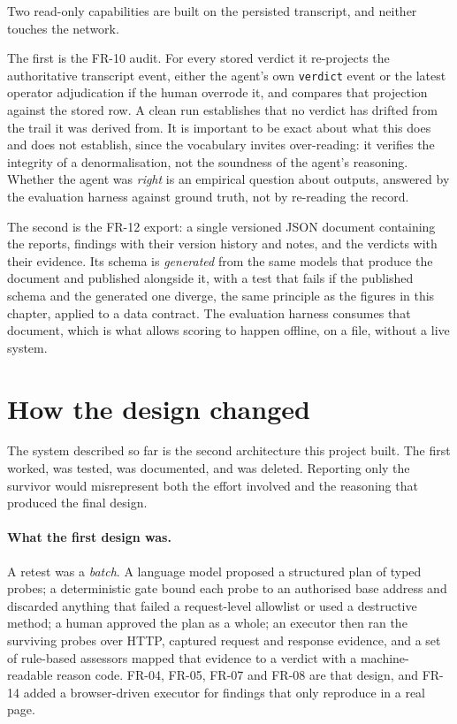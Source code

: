 Two read-only capabilities are built on the persisted transcript, and neither
touches the network.

The first is the FR-10 audit. For every stored verdict it re-projects the
authoritative transcript event, either the agent's own \texttt{verdict} event or the
latest operator adjudication if the human overrode it, and compares that
projection against the stored row. A clean run establishes that no verdict has
drifted from the trail it was derived from. It is important to be exact about
what this does and does not establish, since the vocabulary invites
over-reading: it verifies the integrity of a denormalisation, not the soundness
of the agent's reasoning. Whether the agent was \emph{right} is an empirical
question about outputs, answered by the evaluation harness against ground truth,
not by re-reading the record.

The second is the FR-12 export: a single versioned JSON document containing the
reports, findings with their version history and notes, and the verdicts with
their evidence. Its schema is \emph{generated} from the same models that produce
the document and published alongside it, with a test that fails if the published
schema and the generated one diverge, the same principle as the figures in
this chapter, applied to a data contract. The evaluation harness consumes that
document, which is what allows scoring to happen offline, on a file, without a
live system.

\section{How the design changed}
\label{sec:design-evolution}

The system described so far is the second architecture this project built. The
first worked, was tested, was documented, and was deleted. Reporting only the
survivor would misrepresent both the effort involved and the reasoning that
produced the final design.

\paragraph{What the first design was.} A retest was a \emph{batch}. A language
model proposed a structured plan of typed probes; a deterministic gate bound each
probe to an authorised base address and discarded anything that failed a
request-level allowlist or used a destructive method; a human approved the plan
as a whole; an executor then ran the surviving probes over HTTP, captured request
and response evidence, and a set of rule-based assessors mapped that evidence to
a verdict with a machine-readable reason code. FR-04, FR-05, FR-07 and FR-08 are
that design, and FR-14 added a browser-driven executor for findings that only
reproduce in a real page.

